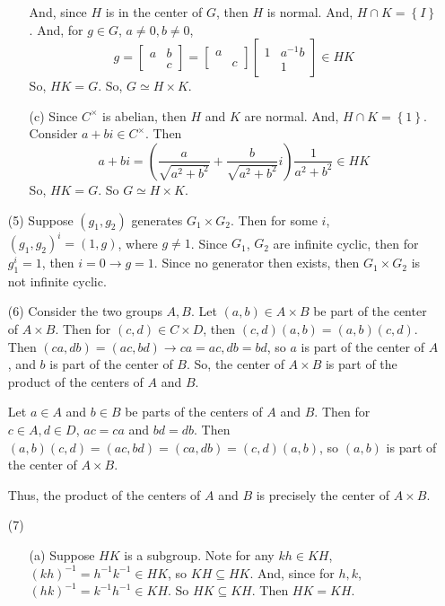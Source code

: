\documentclass[12pt]{article}
\begin{document}
\begin{itemize}
\begin{itemize}
And, since $H$ is in the center of $G$, then $H$ is normal. And, $H \cap K = \left\lbrace I \right\rbrace$. And, for $g \in G$, $a \neq 0, b \neq 0$,
$$g = \begin{bmatrix}
a & b \\
& c
\end{bmatrix} = \begin{bmatrix}
a \\
& c
\end{bmatrix}\begin{bmatrix}
1 & a^{-1}b\\
& 1
\end{bmatrix} \in HK$$
So, $HK = G$. So, $G \simeq H \times K$.
\item[(c)]
Since $C^\times$ is abelian, then $H$ and $K$ are normal. And, $H \cap K = \left\lbrace 1 \right\rbrace$. Consider $a + bi \in C^\times$. Then 
$$a + bi = \left(\frac{a}{\sqrt{a^2+b^2}} + \frac{b}{\sqrt{a^2+b^2}}i\right)\frac{1}{a^2+b^2} \in HK$$
So, $HK = G$. So $G \simeq H \times K$.
\end{itemize}
\item[(5)]
Suppose $(g_1, g_2)$ generates $G_1 \times G_2$. Then for some $i$, $(g_1, g_2)^i = (1, g)$, where $g \neq 1$. Since $G_1$, $G_2$ are infinite cyclic, then for $g_1^i = 1$, then $i = 0 \rightarrow g = 1$. Since no generator then exists, then $G_1 \times G_2$ is not infinite cyclic.
\item[(6)]
Consider the two groups $A, B$. Let $(a, b) \in A \times B$ be part of the center of $A \times B$. Then for $(c, d) \in C \times D$, then $(c, d)(a, b) = (a, b)(c, d)$. Then $(ca, db) = (ac, bd) \rightarrow ca = ac, db = bd$, so $a$ is part of the center of $A$, and $b$ is part of the center of $B$. So, the center of $A \times B$ is part of the product of the centers of $A$ and $B$.

Let $a \in A$ and $b \in B$ be parts of the centers of $A$ and $B$. Then for $c \in A, d \in D$, $ac = ca$ and $bd = db$. Then $(a, b)(c, d) = (ac, bd) = (ca, db) = (c, d)(a, b)$, so $(a, b)$ is part of the center of $A \times B$.

Thus, the product of the centers of $A$ and $B$ is precisely the center of $A \times B$.
\item[(7)]
\begin{itemize}
\item[(a)]
Suppose $HK$ is a subgroup. Note for any $kh \in KH$, $(kh)^{-1} = h^{-1}k^{-1} \in HK$, so $KH \subseteq HK$. And, since for $h, k$, $(hk)^{-1} = k^{-1}h^{-1} \in KH$. So $HK \subseteq KH$. Then $HK = KH$.


\end{itemize}
\end{itemize}
\end{document}
